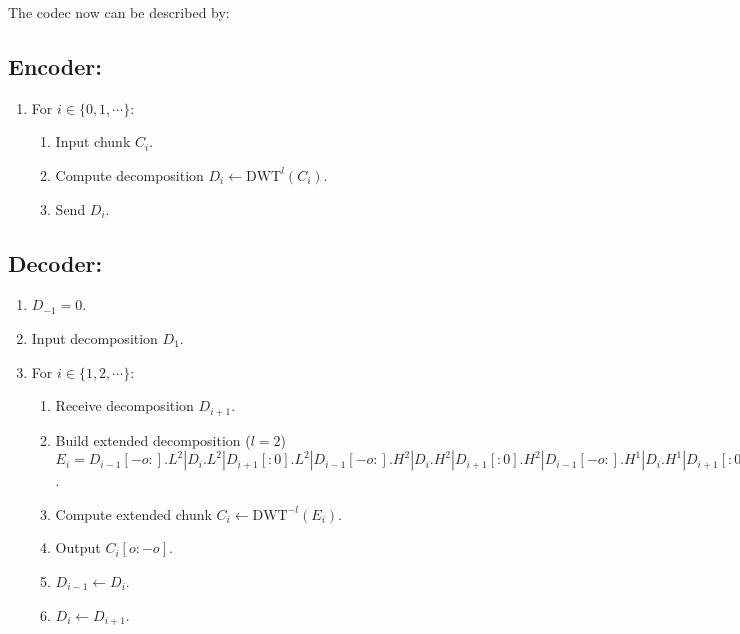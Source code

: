 
The codec now can be described by:

\subsection*{Encoder:}
\begin{enumerate}
\item For $i\in\{0,1,\cdots\}$:   
  \begin{enumerate}               
  \item Input chunk $C_i$.
  \item Compute decomposition $D_i \leftarrow \text{DWT}^l(C_i)$.
  \item Send $D_i$.
  \end{enumerate}
\end{enumerate}

\subsection*{Decoder:}
\begin{enumerate}
\item $D_{-1}=0$.
\item Input decomposition $D_1$.
\item For $i\in\{1,2,\cdots\}$:
  \begin{enumerate}
  \item Receive decomposition $D_{i+1}$.
  \item Build extended decomposition ($l=2$) $E_i =
    D_{i-1}[-o:].L^2|D_i.L^2|D_{i+1}[:0].L^2|D_{i-1}[-o:].H^2|D_i.H^2|D_{i+1}[:0].H^2|D_{i-1}[-o:].H^1|D_i.H^1|D_{i+1}[:0].H^1$.
  \item Compute extended chunk $C_i\leftarrow\text{DWT}^{-l}(E_i)$.
  \item Output $C_i[o:-o]$.
  \item $D_{i-1} \leftarrow D_i$.
  \item $D_i \leftarrow D_{i+1}$.
  \end{enumerate}
\end{enumerate}

